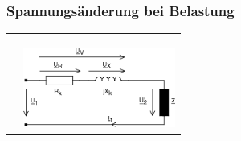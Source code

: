 		\subsubsection{Spannungsänderung bei Belastung}
			\begin{tabular}{p{10cm}p{6cm}}
            		\begin{minipage}{10cm}
	            		\fbox{$\underline{U}_1 =
	            		\underline{U}_R+\underline{U}_X+\underline{U}_2'$} \qquad
	            		\fbox{$\underline{U}_2'=\underline{U}_2 \cdot "u$}\\ \\
	            		\fbox{$\underline{U}_R=R_k \cdot \underline{I}_1$} \qquad
	            		\fbox{$\underline{U}_X=jX_k \cdot \underline{I}_1$}\qquad
	            		\fbox{$\underline{I}_2' = \underline{I}_1$}\\
	            		\end{minipage} &
            		\begin{minipage}{6cm}
	            		\includegraphics[width=5cm]{./bilder/ErsatzschaltbildTrafoLast.png}
	            	\end{minipage}\\			
            \end{tabular}\\ \\

